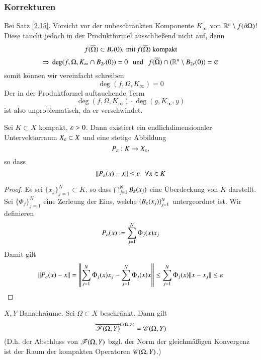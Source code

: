 \subsubsection*{Korrekturen}

Bei Satz \ref{2.15}. Vorsicht vor der unbeschränkten Komponente $K_\infty$ von $\mathbb{R}^n\setminus f(\partial
\Omega)$! Diese taucht jedoch in der Produktformel ausschließend nicht auf, denn
\[
    f(\overline \Omega)\subset B_r(0), \, \text{mit}\, f(\overline \Omega) \text{ kompakt}
\]
\[
    \Rightarrow \, \deg(f,\Omega,K_\infty\cap B_{2r}(0))=0 \hspace{.25cm} \text{und} \hspace{.25cm} f(\overline \Omega) \cap (\mathbb{R}^n\setminus
    B_{2r}(0))=\varnothing
\]
somit können wir vereinfacht schreiben
\[
    \deg(f,\Omega,K_\infty)=0
\]
Der in der Produktformel auftauchende Term
\[
    \deg(f,\Omega,K_\infty)\cdot \deg(g,K_\infty,y)
\]
ist also unproblematisch, da er verschwindet.\\[0.5cm]

\begin{lem}\label{3.5}
    Sei $K\subset X$ kompakt, $\varepsilon>0$. Dann existiert ein endlichdimensionaler Untervektorraum $X_\varepsilon
    \subset X$ und eine stetige Abbildung
    \[
        P_\varepsilon:K\rightarrow X_\varepsilon,
    \]
    so dass
    \[
        \|P_\varepsilon(x)-x\|\leq \varepsilon \hspace{.25cm} \forall x\in K
    \]
\end{lem}

\begin{proof}
    Es sei $\{x_j\}_{j=1}^N\subset K$, so dass $\bigcap _{j=1}^NB_\varepsilon(x_j)$ eine Überdeckung von $K$
    darstellt. Sei $\{\Phi_j\}_{j=1}^N$ eine Zerleung der Eins, welche $\{B_\varepsilon(x_j)\}_{j=1}^N$
    untergeordnet ist. Wir definieren
    \[
        P_\varepsilon(x):= \sum_{j=1}^N \Phi_j(x)x_j
    \]
    Damit gilt
    \[
        \|P_\varepsilon(x)-x\|=\left\|\sum_{j=1}^N\Phi_j(x)x_j-\sum_{j=1}^N \Phi_j(x)x\right\|
        \leq \sum_{j=1}^N \Phi_j(x)\|x-x_j\|\leq \varepsilon
    \]
\end{proof}

\begin{theorem}\label{3.6}
    $X,Y$ Banachräume. Sei $\Omega\subset X$ beschränkt. Dann gilt
    \[
        \overline{\mathscr F(\Omega,Y)}^{C(\Omega,Y)}=\mathscr C(\Omega,Y)
    \]
    (D.h. der Abschluss von $\mathscr F(\Omega,Y)$ bzgl. der Norm der gleichmäßigen Konvergenz ist der Raum
     der kompakten Operatoren $\mathscr C(\Omega,Y)$.)
\end{theorem}

